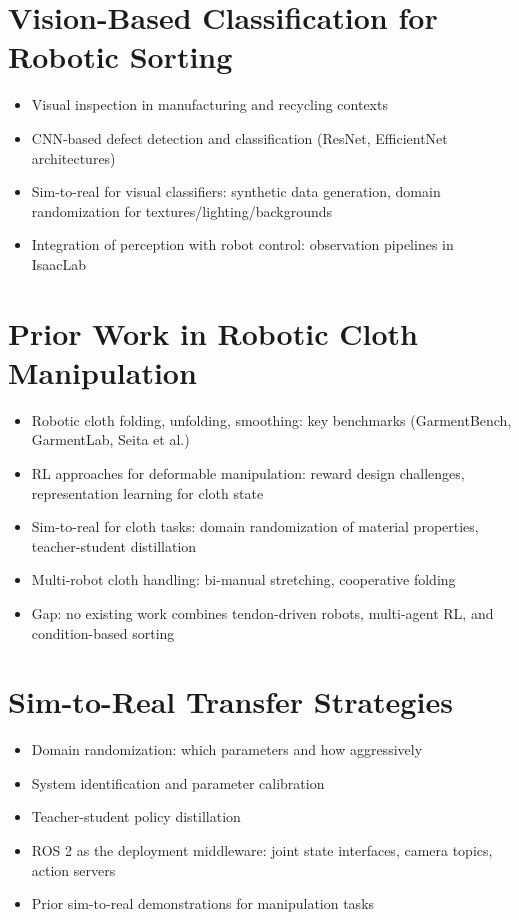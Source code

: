 \section{Vision-Based Classification for Robotic Sorting}
\begin{itemize}
    \item Visual inspection in manufacturing and recycling contexts
    \item CNN-based defect detection and classification (ResNet, EfficientNet architectures)
    \item Sim-to-real for visual classifiers: synthetic data generation, domain randomization for textures/lighting/backgrounds
    \item Integration of perception with robot control: observation pipelines in IsaacLab
\end{itemize}

\section{Prior Work in Robotic Cloth Manipulation}
\begin{itemize}
    \item Robotic cloth folding, unfolding, smoothing: key benchmarks (GarmentBench, GarmentLab, Seita et al.)
    \item RL approaches for deformable manipulation: reward design challenges, representation learning for cloth state
    \item Sim-to-real for cloth tasks: domain randomization of material properties, teacher-student distillation
    \item Multi-robot cloth handling: bi-manual stretching, cooperative folding
    \item Gap: no existing work combines tendon-driven robots, multi-agent RL, and condition-based sorting
\end{itemize}

\section{Sim-to-Real Transfer Strategies}
\begin{itemize}
    \item Domain randomization: which parameters and how aggressively
    \item System identification and parameter calibration
    \item Teacher-student policy distillation
    \item ROS 2 as the deployment middleware: joint state interfaces, camera topics, action servers
    \item Prior sim-to-real demonstrations for manipulation tasks
\end{itemize}


